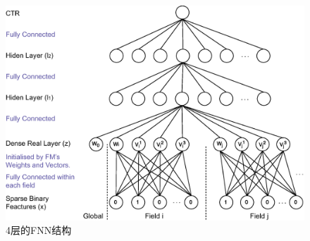 \documentclass{ctexart}
\begin{document}
\begin{figure}[htb]
  \centering
  \includegraphics[width=0.75\columnwidth]{dlctr}
  \caption{ 4层的FNN结构}\label{fig:modelone}
\end{figure}
\end{document}
